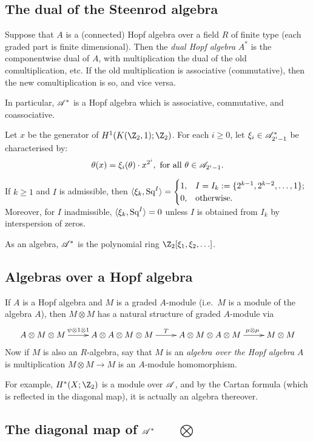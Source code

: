 \documentclass[11pt]{article}
\begin{document}
{\subsection{The dual of the Steenrod algebra}
Suppose that $A$ is a (connected) Hopf algebra over a field $R$ of finite type (each graded part is finite dimensional). Then the \emph{dual Hopf algebra} $A^*$ is the componentwise dual of $A$, with multiplication the dual of the old comultiplication, etc. If the old multiplication is associative (commutative), then the new comultiplication is so, and vice versa.

In particular, $\mathscr{A}^*$ is a Hopf algebra which is associative, commutative, and coassociative.

Let $x$ be the generator of $H^1(K(\Z_2,1);\Z_2)$. For each $i\geq0$, let $\xi_i\in\mathscr{A}^*_{2^i-1}$ be characterised by:
\[\theta(x)=\xi_i(\theta)\cdot x^{2^i},\text{ for all }\theta\in\mathscr{A}_{2^i-1}.\]
\begin{prop*}
If $k\geq1$ and $I$ is admissible, then $\langle\xi_k,\textup{Sq}^I\rangle=\begin{cases}1,&I=I_k:=\{2^{k-1},2^{k-2},\ldots,1\};\\0,&\textup{otherwise.}\end{cases}$ Moreover, for $I$ inadmissible, $\langle\xi_k,\textup{Sq}^I\rangle=0$ unless $I$ is obtained from $I_k$ by interspersion of zeros.
\end{prop*}
As an algebra, $\mathscr{A}^*$ is the polynomial ring $\Z_2[\xi_1,\xi_2,\ldots]$.

\subsection{Algebras over a Hopf algebra}
If $A$ is a Hopf algebra and $M$ is a graded $A$-module (i.e.\ $M$ is a module of the algebra $A$), then $M\otimes M$ has a natural structure of graded $A$-module via
\[\xymatrix{
A\otimes M\otimes M\ar[r]^{\psi\otimes1\otimes1\ \ \ }&A\otimes A\otimes M\otimes M\ar[r]^T&A\otimes M\otimes A\otimes M\ar[r]^{\qquad\mu\otimes \mu\ }&M\otimes M
}\]
Now if $M$ is also an $R$-algebra, say that $M$ is an \emph{algebra over the Hopf algebra} $A$ is multiplication $M\otimes M\to M$ is an $A$-module homomorphism.

For example, $H^*(X;\Z_2)$ is a module over $\mathscr{A}$, and by the Cartan formula (which is reflected in the diagonal map), it is actually an algebra thereover.
\subsection{The diagonal map of \texorpdfstring{$\mathscr{A}^*$\ \ \ $\bigotimes$}{A}}
}
\end{document}
